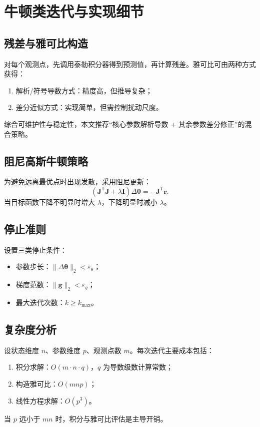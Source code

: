 \chapter{牛顿类迭代与实现细节}

\section{残差与雅可比构造}
对每个观测点，先调用泰勒积分器得到预测值，再计算残差。雅可比可由两种方式获得：
\begin{enumerate}
  \item 解析/符号导数方式：精度高，但推导复杂；
  \item 差分近似方式：实现简单，但需控制扰动尺度。
\end{enumerate}
综合可维护性与稳定性，本文推荐“核心参数解析导数 + 其余参数差分修正”的混合策略。

\section{阻尼高斯牛顿策略}
为避免远离最优点时出现发散，采用阻尼更新：
\[
\left(\mathbf{J}^\mathsf{T}\mathbf{J}+\lambda \mathbf{I}\right)\Delta\boldsymbol{\theta}
=-\mathbf{J}^\mathsf{T}\mathbf{r}.
\]
当目标函数下降不明显时增大 $\lambda$，下降明显时减小 $\lambda$。

\section{停止准则}
设置三类停止条件：
\begin{itemize}
  \item 参数步长：$\|\Delta\boldsymbol{\theta}\|_2 < \varepsilon_\theta$；
  \item 梯度范数：$\|\mathbf{g}\|_2 < \varepsilon_g$；
  \item 最大迭代次数：$k\ge k_{\max}$。
\end{itemize}

\section{复杂度分析}
设状态维度 $n$、参数维度 $p$、观测点数 $m$。每次迭代主要成本包括：
\begin{enumerate}
  \item 积分求解：$O(m\cdot n \cdot q)$，$q$ 为导数级数计算常数；
  \item 构造雅可比：$O(mnp)$；
  \item 线性方程求解：$O(p^3)$。
\end{enumerate}
当 $p$ 远小于 $mn$ 时，积分与雅可比评估是主导开销。
